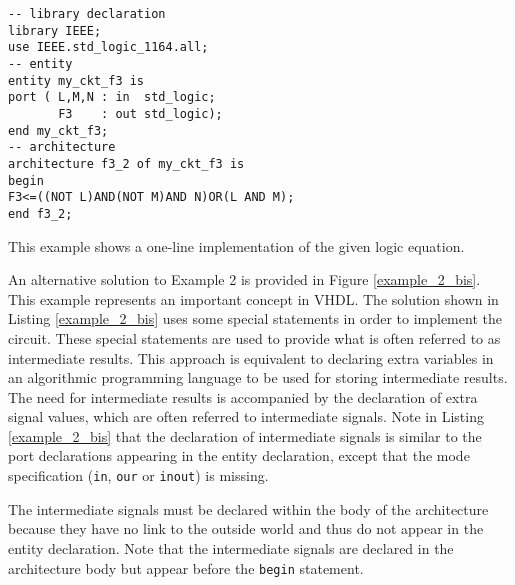 \noindent
\begin{minipage}{0.57\linewidth}
\begin{lstlisting}[label=example_2, caption=Solution of Example 2.]
-- library declaration
library IEEE;
use IEEE.std_logic_1164.all;
-- entity
entity my_ckt_f3 is
port ( L,M,N : in  std_logic;
       F3    : out std_logic);
end my_ckt_f3;
-- architecture
architecture f3_2 of my_ckt_f3 is
begin
F3<=((NOT L)AND(NOT M)AND N)OR(L AND M);
end f3_2;
\end{lstlisting}
\end{minipage}
\begin{minipage}{0.4\linewidth}
\begin{flushright}
\end{flushright}
\end{minipage}

This example shows a one-line implementation of the given logic equation.

An alternative solution to Example 2 is provided in Figure \ref{example_2_bis}. This example represents an important concept in VHDL. The solution shown in Listing \ref{example_2_bis} uses some special statements in order to implement the circuit. These special statements are used to provide what is often referred to as intermediate results. This approach is equivalent to declaring extra variables in an algorithmic programming language to be used for storing intermediate results. The need for intermediate results is accompanied by the declaration of extra signal values, which are often referred to intermediate signals. Note in Listing \ref{example_2_bis} that the declaration of intermediate signals is similar to the port declarations appearing in the entity declaration, except that the mode specification (\texttt{in}, \texttt{our} or \texttt{inout}) is missing. 

The intermediate signals must be declared within the body of the architecture because they have no link to the outside world and thus do not appear in the entity declaration. Note that the intermediate signals are declared in the architecture body but appear before the \texttt{begin} statement.

